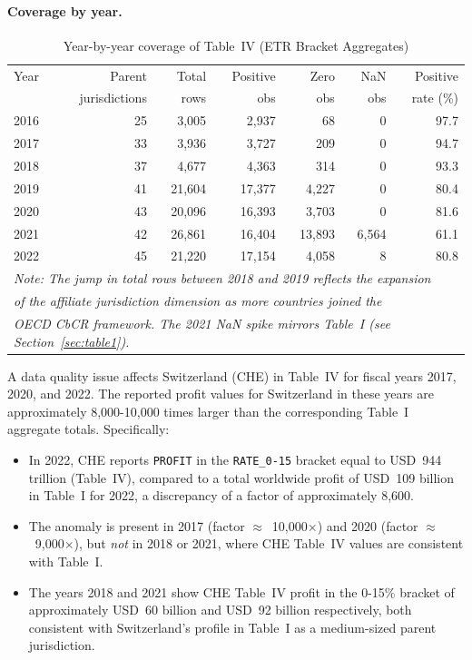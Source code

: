 \documentclass[11pt,a4paper]{article}
\newcommand{\code}[1]{\texttt{#1}}
\begin{document}
\paragraph{Coverage by year.}
\begin{table}[H]
\centering
\caption{Year-by-year coverage of Table~IV (ETR Bracket Aggregates)}
\label{tab:t4yearcoverage}
\begin{tabular}{@{}lrrrrrr@{}}
\toprule
Year & Parent & Total & Positive & Zero & NaN & Positive \\
 & jurisdictions & rows & obs & obs & obs & rate (\%) \\
\midrule
2016 & 25 & 3,005 & 2,937 & 68 & 0 & 97.7 \\
2017 & 33 & 3,936 & 3,727 & 209 & 0 & 94.7 \\
2018 & 37 & 4,677 & 4,363 & 314 & 0 & 93.3 \\
2019 & 41 & 21,604 & 17,377 & 4,227 & 0 & 80.4 \\
2020 & 43 & 20,096 & 16,393 & 3,703 & 0 & 81.6 \\
2021 & 42 & 26,861 & 16,404 & 13,893 & 6,564 & 61.1 \\
2022 & 45 & 21,220 & 17,154 & 4,058 & 8 & 80.8 \\
\midrule
\multicolumn{7}{l}{\small\textit{Note: The jump in total rows between 2018 and 2019 reflects the expansion}} \\
\multicolumn{7}{l}{\small\textit{of the affiliate jurisdiction dimension as more countries joined the}} \\
\multicolumn{7}{l}{\small\textit{OECD CbCR framework. The 2021 NaN spike mirrors Table~I (see Section~\ref{sec:table1}).}} \\
\bottomrule
\end{tabular}
\end{table}

A data quality issue affects Switzerland (CHE) in Table~IV for fiscal years 2017, 2020, and 2022. The reported profit values for Switzerland in these years are approximately 8,000-10,000 times larger than the corresponding Table~I aggregate totals. Specifically:

\begin{itemize}
  \item In 2022, CHE reports \code{PROFIT} in the \code{RATE\_0-15} bracket
          equal to USD~944 trillion (Table~IV), compared to a total worldwide
          profit of USD~109 billion in Table~I for 2022, a discrepancy of a
          factor of approximately 8,600.
    \item The anomaly is present in 2017 (factor $\approx$~10,000$\times$)
          and 2020 (factor $\approx$~9,000$\times$), but \emph{not} in
          2018 or 2021, where CHE Table~IV values are consistent with Table~I.
    \item The years 2018 and 2021 show CHE Table~IV profit in the 0-15\%
          bracket of approximately USD~60 billion and USD~92 billion
          respectively, both consistent with Switzerland's profile in Table~I
          as a medium-sized parent jurisdiction.
\end{itemize}
\end{document}
